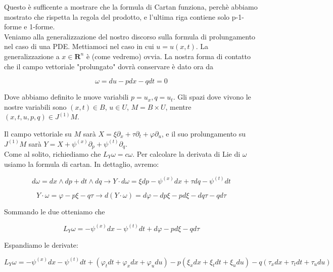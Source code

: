 \documentclass{report}
\begin{document}
Questo è sufficente a mostrare che la formula di Cartan funziona, perchè abbiamo mostrato che rispetta la regola del prodotto, e l'ultima riga contiene solo p-1-forme e 1-forme. \\

Veniamo alla generalizzazione del nostro discorso sulla formula di prolungamento nel caso di una PDE. Mettiamoci nel caso in cui $u = u(x, t)$.  La generalizzazione a $x \in \mathbf{R}^n$ è (come vedremo) ovvia. La nostra forma di contatto che il campo vettoriale "prolungato" dovrà conservare è dato ora da 

\begin{equation}
    \omega = du - pdx - qdt =0
\end{equation}

Dove abbiamo definito le nuove variabili $p = u_x, q = u_t$. Gli spazi dove vivono le nostre variabili sono $(x,t) \in B$, $u \in U$, $M = B \times U$, mentre $(x, t, u, p, q) \in J^{(1)}M$. 

Il campo vettoriale su $M$ sarà $X = \xi\partial_x + \tau\partial_t + \varphi\partial_u$, e il suo prolungamento su $J^{(1)}M$ sarà $Y = X + \psi^{(x)}\partial_p + \psi^{(t)}\partial_q$. \\

Come al solito, richiediamo che $L_Y\omega = c\omega$. Per calcolare la derivata di Lie di $\omega$ usiamo la formula di cartan. In dettaglio, avremo:

\begin{equation}
    d\omega = dx \wedge dp + dt \wedge dq \rightarrow Y \cdot d\omega = \xi dp - \psi^{(x)}dx + \tau dq- \psi^{(t)}dt
\end{equation}

\begin{equation}
    Y \cdot \omega = \varphi-p\xi  -q\tau \rightarrow d(Y \cdot \omega) = d\varphi -dp\xi - pd\xi -dq\tau - qd\tau 
\end{equation}

Sommando le due otteniamo che 

\begin{equation}
    L_Y\omega = -\psi^{(x)}dx -\psi^{(t)}dt + d\varphi - pd\xi -qd\tau 
\end{equation}

Espandiamo le derivate: 

\begin{equation}
     L_Y\omega = -\psi^{(x)}dx -\psi^{(t)}dt + (\varphi_tdt +\varphi_xdx +\varphi_udu) - p(\xi_xdx + \xi_tdt + \xi_udu) -q(\tau_xdx + \tau_tdt + \tau_udu)
\end{equation}
\end{document}
